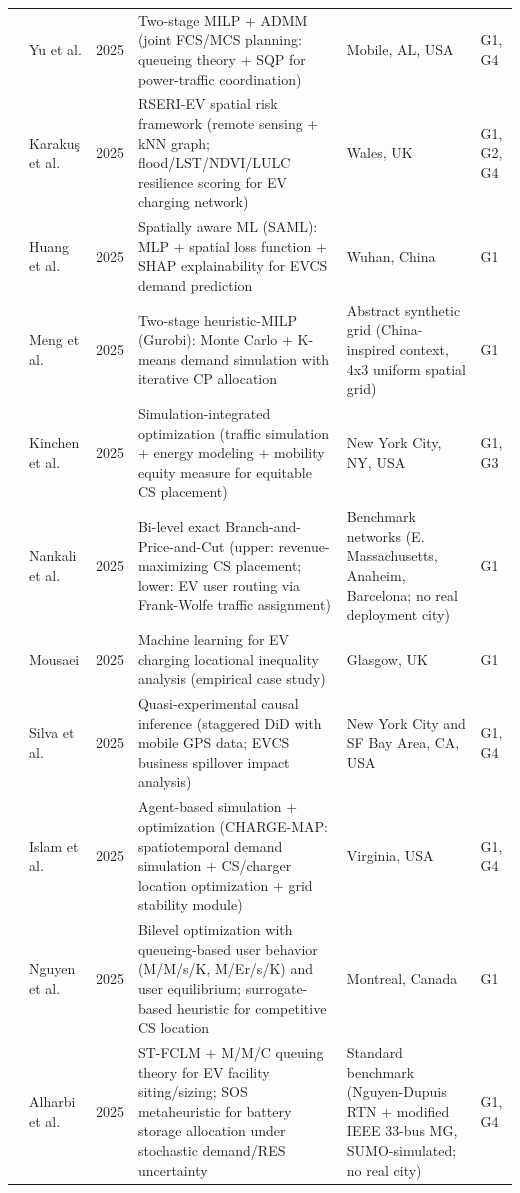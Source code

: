 \documentclass[letterpaper, 12pt, oneside, doublespacing]{Thesis}
\begin{document}
\begin{longtable}{L{0.9cm} L{2.2cm} L{0.8cm} L{3.3cm} L{2.5cm} L{1.5cm}}
\cite{a_joint_2025} & Yu et al. & 2025 & Two-stage MILP + ADMM (joint FCS/MCS planning: queueing theory + SQP for power-traffic coordination) & Mobile, AL, USA & G1, G4 \\
\cite{a_multi-modal_2025} & Karaku\c{s} et al. & 2025 & RSERI-EV spatial risk framework (remote sensing + kNN graph; flood/LST/NDVI/LULC resilience scoring for EV charging network) & Wales, UK & G1, G2, G4 \\
\cite{a_spatially_2025} & Huang et al. & 2025 & Spatially aware ML (SAML): MLP + spatial loss function + SHAP explainability for EVCS demand prediction & Wuhan, China & G1 \\
\cite{a_two-stage_2025} & Meng et al. & 2025 & Two-stage heuristic-MILP (Gurobi): Monte Carlo + K-means demand simulation with iterative CP allocation & Abstract synthetic grid (China-inspired context, 4x3 uniform spatial grid) & G1 \\
\cite{a_united_2025} & Kinchen et al. & 2025 & Simulation-integrated optimization (traffic simulation + energy modeling + mobility equity measure for equitable CS placement) & New York City, NY, USA & G1, G3 \\
\cite{an_exact_2025} & Nankali et al. & 2025 & Bi-level exact Branch-and-Price-and-Cut (upper: revenue-maximizing CS placement; lower: EV user routing via Frank-Wolfe traffic assignment) & Benchmark networks (E. Massachusetts, Anaheim, Barcelona; no real deployment city) & G1 \\
\cite{analyzing_locational_2025} & Mousaei & 2025 & Machine learning for EV charging locational inequality analysis (empirical case study) & Glasgow, UK & G1 \\
\cite{causal_spillover_2025} & Silva et al. & 2025 & Quasi-experimental causal inference (staggered DiD with mobile GPS data; EVCS business spillover impact analysis) & New York City and SF Bay Area, CA, USA & G1, G4 \\
\cite{charge-map_an_2025} & Islam et al. & 2025 & Agent-based simulation + optimization (CHARGE-MAP: spatiotemporal demand simulation + CS/charger location optimization + grid stability module) & Virginia, USA & G1, G4 \\
\cite{competitive_ev_2025} & Nguyen et al. & 2025 & Bilevel optimization with queueing-based user behavior (M/M/s/K, M/Er/s/K) and user equilibrium; surrogate-based heuristic for competitive CS location & Montreal, Canada & G1 \\
\cite{data-driven_ev_2025} & Alharbi et al. & 2025 & ST-FCLM + M/M/C queuing theory for EV facility siting/sizing; SOS metaheuristic for battery storage allocation under stochastic demand/RES uncertainty & Standard benchmark (Nguyen-Dupuis RTN + modified IEEE 33-bus MG, SUMO-simulated; no real city) & G1, G4 \\

\end{longtable}
\end{document}
